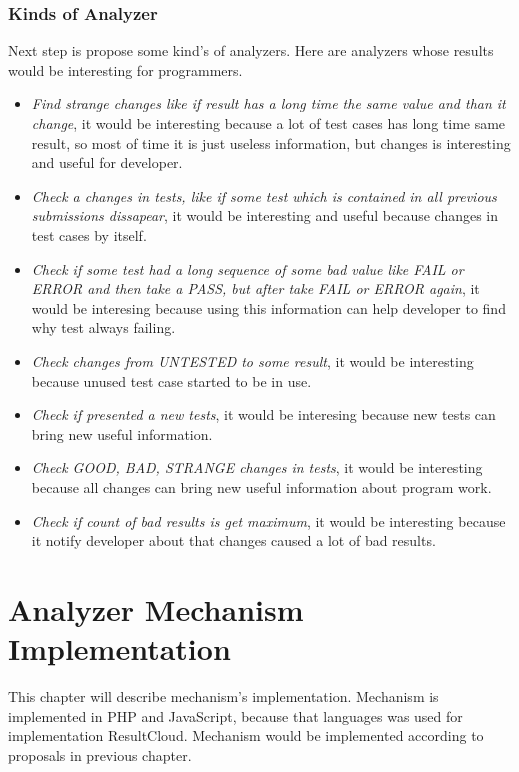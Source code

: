 \subsection{Kinds of Analyzer}
\label{subsec:kinds}

Next step is propose some kind's of analyzers. Here are analyzers whose results would be interesting for programmers.
\begin{itemize} 
\item \emph{Find strange changes like if result has a long time the same value and than it change}, it would be interesting because a lot of test cases has long time same result, so most of time it is just useless information, but changes is interesting and useful for developer.
\item \emph{Check a changes in tests, like if some test which is contained in all previous submissions dissapear}, it would be interesting and useful because changes in test cases by itself.
\item \emph{Check if some test had a long sequence of some bad value like FAIL or ERROR and then take a PASS, but after take FAIL or ERROR again}, it would be interesing because using this information can help developer to find why test always failing.
\item \emph{Check changes from UNTESTED to some result}, it would be interesting because unused test case started to be in use.
\item \emph{Check if presented a new tests}, it would be interesing because new tests can bring new useful information.
\item \emph{Check GOOD, BAD, STRANGE changes in tests}, it would be interesting because all changes can bring new useful information about program work. 
\item \emph{Check if count of bad results is get maximum}, it would be interesting because it notify developer about that changes caused a lot of bad results.
\end{itemize}

\chapter{Analyzer Mechanism Implementation}
\label{ch:analyzer_implement}

This chapter will describe mechanism's implementation. Mechanism is implemented in PHP and JavaScript, because that languages was used for implementation ResultCloud. Mechanism would be implemented according to proposals in previous chapter.

